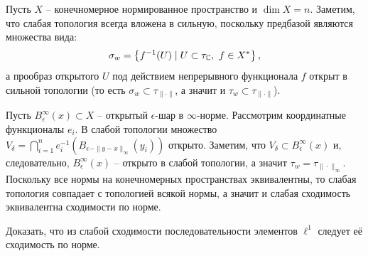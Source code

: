 \begin{solution}
    Пусть $X$ -- конечномерное нормированное пространство и $\dim X = n$.
    Заметим, что слабая топология всегда вложена в сильную, поскольку предбазой являются множества вида:
    \[
        \sigma_w = \left\{ f^{-1}(U) \mid U \subset \tau_{\mathbb{C}}, \ f \in X^* \right\},
    \]
    а прообраз открытого $U$ под действием непрерывного функционала $f$ открыт в сильной топологии (то есть $\sigma_w \subset \tau_{\|\cdot\|}$, а значит и $\tau_w \subset \tau_{\|\cdot\|}$).

    Пусть $B_\epsilon^{\infty}(x) \subset X$ -- открытый $\epsilon$-шар в $\infty$-норме.
    Рассмотрим координатные функционалы $e_i$.
    В слабой топологии множество $V_\delta = \bigcap_{i = 1}^{n} e_i^{-1}(B_{\epsilon - \|y - x\|_\infty}(y_i))$ открыто.
    Заметим, что $V_{\delta} \subset B_{\epsilon}^{\infty}(x)$ и, следовательно, $B_{\epsilon}^{\infty}(x)$ -- открыто в слабой топологии, а значит $\tau_w = \tau_{\|\cdot\|_{\infty}}$.
    Поскольку все нормы на конечномерных пространствах эквивалентны, то слабая топология совпадает с топологией всякой нормы, а значит и слабая сходимость эквивалентна сходимости по норме.
\end{solution}
\begin{task}[10.7]
    Доказать, что из слабой сходимости последовательности элементов $\ell^1$ следует её сходимость по норме.
\end{task}
